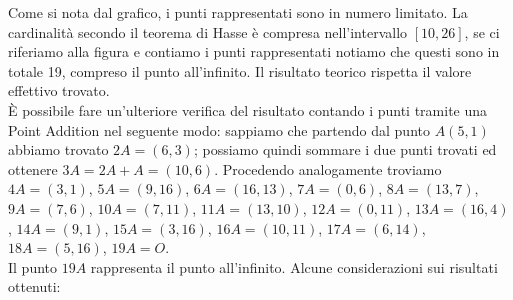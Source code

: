 \documentclass[a4paper,12pt]{tesiinfo}
\begin{document}
Come si nota dal grafico, i punti rappresentati sono in numero limitato. La cardinalit\`a secondo il teorema di Hasse \`e compresa nell'intervallo $[10, 26]$, se ci riferiamo alla figura e contiamo i punti rappresentati notiamo che questi sono in totale 19, compreso il punto all'infinito. Il risultato teorico rispetta il valore effettivo trovato.
\\
\`E possibile fare un'ulteriore verifica del risultato contando i punti tramite una Point Addition nel seguente modo: sappiamo che partendo dal punto $A(5, 1)$ abbiamo trovato $2A = (6, 3)$; possiamo quindi sommare i due punti trovati ed ottenere $3A = 2A + A = (10, 6)$. Procedendo analogamente troviamo $4A = (3, 1)$, $5A = (9, 16)$, $6A = (16, 13)$, $7A = (0, 6)$, $8A = (13, 7)$, $9A = (7, 6)$, $10A = (7, 11)$, $11A = (13, 10)$, $12A = (0, 11)$, $13A = (16, 4)$,  $14A = (9, 1)$, $15A = (3, 16)$, $16A = (10, 11)$, $17A = (6, 14)$, $18A = (5, 16)$, $19A = O$.
\\
Il punto $19A$ rappresenta il punto all'infinito.
Alcune considerazioni sui risultati ottenuti:
\end{document}
